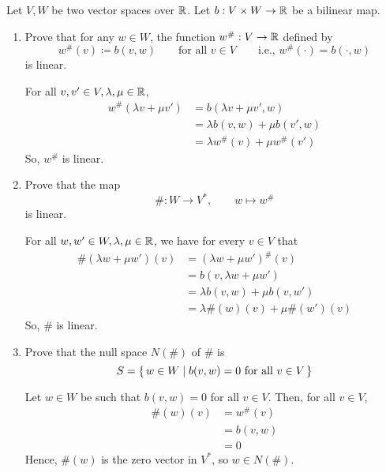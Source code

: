 \documentclass{article}
\begin{document}
\begin{problem}
Let $V, W$ be two vector spaces over $\mathbb{R}$.
Let $b : V \times W \to \mathbb{R}$ be a bilinear map.
\begin{enumerate}[label=\bfalph]
	\item Prove that for any $w \in W$, the function $w^{\#} : V \to \mathbb{R}$ defined by
	      \[
		      w^{\#}(v) \coloneq b(v, w) \qquad \text{for all $v \in V$} \qquad \text{i.e., $w^{\#}(\cdot) = b(\cdot, w)$}
	      \]
	      is linear.
	      \begin{solution}
		      For all $v, v' \in V, \lambda, \mu \in \mathbb{R}$,
		      \begin{align*}
			      w^{\#}(\lambda v + \mu v') & = b(\lambda v + \mu v', w)                             \\
			                                 & = \lambda b(v, w) + \mu b(v', w) \tag{$b$ is bilinear} \\
			                                 & = \lambda w^{\#}(v) + \mu w^{\#}(v')
		      \end{align*}
		      So, $w^{\#}$ is linear.
	      \end{solution}

	\item Prove that the map
	      \[
		      \# : W \to V^*, \qquad w \mapsto w^{\#}
	      \]
	      is linear.
	      \begin{solution}
		      For all $w, w' \in W, \lambda, \mu \in \mathbb{R}$, we have for every $v \in V$ that
		      \begin{align*}
			      \#(\lambda w + \mu w')(v) & = (\lambda w + \mu w')^{\#}(v)                         \\
			                                & = b(v, \lambda w + \mu w')                             \\
			                                & = \lambda b(v, w) + \mu b(v, w') \tag{$b$ is bilinear} \\
			                                & = \lambda \#(w)(v) + \mu \#(w')(v)
		      \end{align*}
		      So, $\#$ is linear.
	      \end{solution}

	\item Prove that the null space $N(\#)$ of $\#$ is
	      \[
		      S = \set{w \in W \mid b(v, w) = 0 \text{ for all $v \in V$}}
	      \]
	      \begin{solution}
		      Let $w \in W$ be such that $b(v, w) = 0$ for all $v \in V$.
		      Then, for all $v \in V$,
		      \begin{align*}
			      \#(w)(v) & = w^{\#}(v) \\
			               & = b(v, w)   \\
			               & = 0
		      \end{align*}
		      Hence, $\#(w)$ is the zero vector in $V^*$, so $w \in N(\#)$.


\end{solution}
\end{enumerate}
\end{problem}
\end{document}
